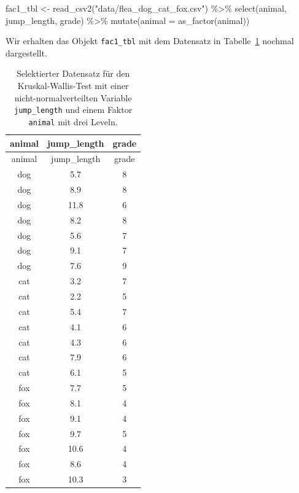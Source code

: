\documentclass[
  letterpaper,
]{scrbook}
\newenvironment{Shaded}{\begin{snugshade}}{\end{snugshade}}
\newcommand{\AttributeTok}[1]{\textcolor[rgb]{0.40,0.45,0.13}{#1}}
\newcommand{\FunctionTok}[1]{\textcolor[rgb]{0.28,0.35,0.67}{#1}}
\newcommand{\NormalTok}[1]{\textcolor[rgb]{0.00,0.23,0.31}{#1}}
\newcommand{\OtherTok}[1]{\textcolor[rgb]{0.00,0.23,0.31}{#1}}
\newcommand{\SpecialCharTok}[1]{\textcolor[rgb]{0.37,0.37,0.37}{#1}}
\newcommand{\StringTok}[1]{\textcolor[rgb]{0.13,0.47,0.30}{#1}}
\begin{document}
\begin{Shaded}
\begin{Highlighting}[]
\NormalTok{fac1\_tbl }\OtherTok{\textless{}{-}} \FunctionTok{read\_csv2}\NormalTok{(}\StringTok{"data/flea\_dog\_cat\_fox.csv"}\NormalTok{) }\SpecialCharTok{\%\textgreater{}\%}
  \FunctionTok{select}\NormalTok{(animal, jump\_length, grade) }\SpecialCharTok{\%\textgreater{}\%} 
  \FunctionTok{mutate}\NormalTok{(}\AttributeTok{animal =} \FunctionTok{as\_factor}\NormalTok{(animal))}
\end{Highlighting}
\end{Shaded}

Wir erhalten das Objekt \texttt{fac1\_tbl} mit dem Datensatz in
Tabelle~\ref{tbl-data-kruskal-1} nochmal dargestellt.

\hypertarget{tbl-data-kruskal-1}{}
\begin{longtable}[]{@{}ccc@{}}
\caption{\label{tbl-data-kruskal-1}Selektierter Datensatz für den
Kruskal-Wallis-Test mit einer nicht-normalverteilten Variable
\texttt{jump\_length} und einem Faktor \texttt{animal} mit drei
Leveln.}\tabularnewline
\toprule()
animal & jump\_length & grade \\
\midrule()
\endfirsthead
\toprule()
animal & jump\_length & grade \\
\midrule()
\endhead
dog & 5.7 & 8 \\
dog & 8.9 & 8 \\
dog & 11.8 & 6 \\
dog & 8.2 & 8 \\
dog & 5.6 & 7 \\
dog & 9.1 & 7 \\
dog & 7.6 & 9 \\
cat & 3.2 & 7 \\
cat & 2.2 & 5 \\
cat & 5.4 & 7 \\
cat & 4.1 & 6 \\
cat & 4.3 & 6 \\
cat & 7.9 & 6 \\
cat & 6.1 & 5 \\
fox & 7.7 & 5 \\
fox & 8.1 & 4 \\
fox & 9.1 & 4 \\
fox & 9.7 & 5 \\
fox & 10.6 & 4 \\
fox & 8.6 & 4 \\
fox & 10.3 & 3 \\
\bottomrule()
\end{longtable}
\end{document}
